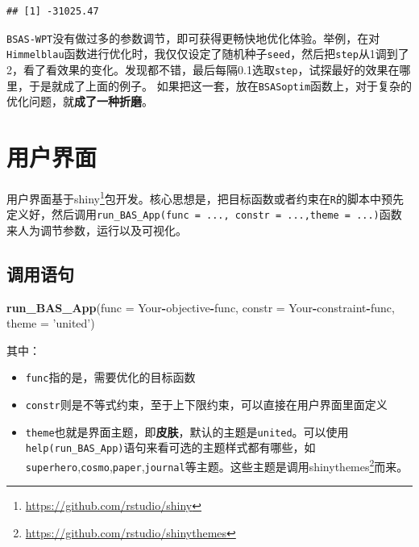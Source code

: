 \documentclass[]{ctexbook}
\newenvironment{Shaded}{\begin{snugshade}}{\end{snugshade}}
\newcommand{\KeywordTok}[1]{\textcolor[rgb]{0.13,0.29,0.53}{\textbf{#1}}}
\newcommand{\DataTypeTok}[1]{\textcolor[rgb]{0.13,0.29,0.53}{#1}}
\newcommand{\StringTok}[1]{\textcolor[rgb]{0.31,0.60,0.02}{#1}}
\newcommand{\OperatorTok}[1]{\textcolor[rgb]{0.81,0.36,0.00}{\textbf{#1}}}
\newcommand{\NormalTok}[1]{#1}
\renewcommand{\href}[2]{#2\footnote{\url{#1}}}
\theoremstyle{definition}
\theoremstyle{definition}
\theoremstyle{definition}
\theoremstyle{remark}
\begin{document}
\begin{verbatim}
## [1] -31025.47
\end{verbatim}

\texttt{BSAS-WPT}没有做过多的参数调节，即可获得更畅快地优化体验。举例，在对\texttt{Himmelblau}函数进行优化时，我仅仅设定了随机种子\texttt{seed}，然后把\texttt{step}从1调到了2，看了看效果的变化。发现都不错，最后每隔0.1选取\texttt{step}，试探最好的效果在哪里，于是就成了上面的例子。
如果把这一套，放在\texttt{BSASoptim}函数上，对于复杂的优化问题，就\textbf{成了一种折磨}。

\chapter{用户界面}\label{interface}

用户界面基于\href{https://github.com/rstudio/shiny}{shiny}包开发。核心思想是，把目标函数或者约束在\texttt{R}的脚本中预先定义好，然后调用\texttt{run\_BAS\_App(func\ =\ ...,\ constr\ =\ ...,theme\ =\ ...)}函数来人为调节参数，运行以及可视化。

\section{调用语句}

\begin{Shaded}
\begin{Highlighting}[]
\KeywordTok{run_BAS_App}\NormalTok{(}\DataTypeTok{func =}\NormalTok{ Your}\OperatorTok{-}\NormalTok{objective}\OperatorTok{-}\NormalTok{func,}
            \DataTypeTok{constr =}\NormalTok{ Your}\OperatorTok{-}\NormalTok{constraint}\OperatorTok{-}\NormalTok{func,}
            \DataTypeTok{theme =} \StringTok{'united'}\NormalTok{)}
\end{Highlighting}
\end{Shaded}

其中：

\begin{itemize}
\item
  \texttt{func}指的是，需要优化的目标函数
\item
  \texttt{constr}则是不等式约束，至于上下限约束，可以直接在用户界面里面定义
\item
  \texttt{theme}也就是界面主题，即\textbf{皮肤}，默认的主题是\texttt{united}。可以使用\texttt{help(run\_BAS\_App)}语句来看可选的主题样式都有哪些，如\texttt{superhero},\texttt{cosmo},\texttt{paper},\texttt{journal}等主题。这些主题是调用\href{https://github.com/rstudio/shinythemes}{shinythemes}而来。
\end{itemize}
\end{document}
